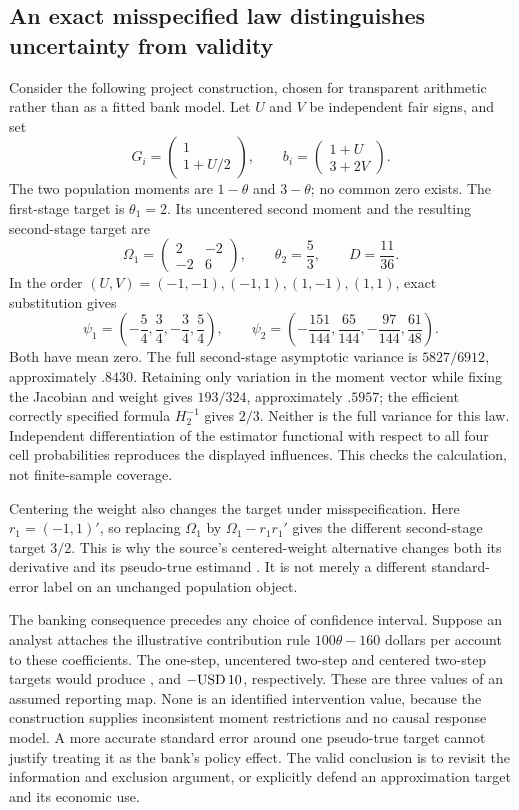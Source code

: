 \subsection{An exact misspecified law distinguishes uncertainty from validity}
Consider the following project construction, chosen for transparent
arithmetic rather than as a fitted bank model. Let $U$ and $V$ be independent
fair signs, and set
\[
 G_i=\begin{pmatrix}1\\1+U/2\end{pmatrix},\qquad
 b_i=\begin{pmatrix}1+U\\3+2V\end{pmatrix}.
\]
The two population moments are $1-\theta$ and $3-\theta$; no common
zero exists. The first-stage target is $\theta_1=2$. Its uncentered
second moment and the resulting second-stage target are
\[
 \Omega_1=\begin{pmatrix}2&-2\\-2&6\end{pmatrix},\qquad
 \theta_2=\frac53,\qquad D=\frac{11}{36}.
\]
In the order $(U,V)=(-1,-1),(-1,1),(1,-1),(1,1)$, exact substitution gives
\[
 \psi_1=\left(-\frac54,\frac34,-\frac34,\frac54\right),\qquad
 \psi_2=\left(-\frac{151}{144},\frac{65}{144},
                     -\frac{97}{144},\frac{61}{48}\right).
\]
Both have mean zero. The full second-stage asymptotic variance is
$5827/6912$, approximately $.8430$. Retaining only variation in the
moment vector while fixing the Jacobian and weight gives $193/324$,
approximately $.5957$; the efficient correctly specified formula
$H_2^{-1}$ gives $2/3$. Neither is the full variance for this law.
Independent differentiation of the estimator functional with respect to
all four cell probabilities reproduces the displayed influences.
This checks the calculation, not finite-sample coverage.

Centering the weight also changes the target under misspecification.
Here $r_1=(-1,1)'$, so replacing $\Omega_1$ by
$\Omega_1-r_1r_1'$ gives the different second-stage target $3/2$.
This is why the source's centered-weight alternative changes both
its derivative and its pseudo-true estimand
\citep[Section 4, Remark 2]{rel32hkl}. It is not merely a different
standard-error label on an unchanged population object.

The banking consequence precedes any choice of confidence interval.
Suppose an analyst attaches the illustrative contribution rule
$100\theta-160$ dollars per account to these coefficients. The one-step,
uncentered two-step and centered two-step targets would produce
,  and $-\mathrm{USD}\,10$, respectively. These are three
values of an assumed reporting map. None is an identified intervention
value, because the construction supplies inconsistent moment restrictions
and no causal response model. A more accurate standard error around one
pseudo-true target cannot justify treating it as the bank's policy effect.
The valid conclusion is to revisit the information and exclusion argument,
or explicitly defend an approximation target and its economic use.

